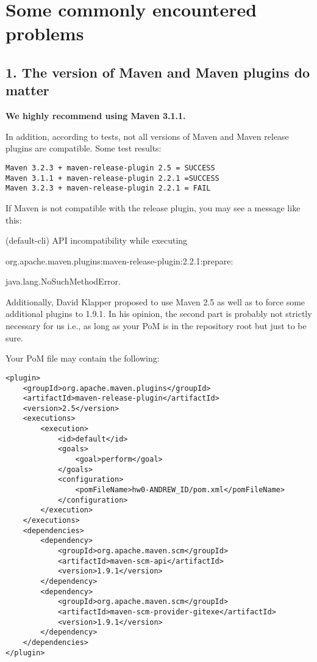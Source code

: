 \section{Some commonly encountered problems}
\label{SectCommProblem}

\subsection{1. The version of Maven and Maven plugins do matter}
\textbf{We highly recommend using Maven 3.1.1.}

In addition, according to tests, not all versions of Maven and Maven release plugins are compatible.
Some test results:
\begin{verbatim}
Maven 3.2.3 + maven-release-plugin 2.5 = SUCCESS
Maven 3.1.1 + maven-release-plugin 2.2.1 =SUCCESS
Maven 3.2.3 + maven-release-plugin 2.2.1 = FAIL
\end{verbatim}


If Maven is not compatible with the release plugin, you may see a message like this:
\begin{qa}
\item[]
(default-cli)  API incompatibility while executing 
\item[]
org.apache.maven.plugins:maven-release-plugin:2.2.1:prepare: 
\item[] java.lang.NoSuchMethodError.
\end{qa}

Additionally, David Klapper proposed to use Maven 2.5
as well as to  force some additional plugins to 1.9.1.
In his opinion, the second part is probably not strictly necessary for us i.e., 
as long as your PoM is in the repository root but just to be sure.

Your PoM file may contain the following:
\begin{verbatim}
<plugin>
    <groupId>org.apache.maven.plugins</groupId>
    <artifactId>maven-release-plugin</artifactId>
    <version>2.5</version>
    <executions>
        <execution>
            <id>default</id>
            <goals>
                <goal>perform</goal>
            </goals>
            <configuration>
                <pomFileName>hw0-ANDREW_ID/pom.xml</pomFileName>
            </configuration>
        </execution>
    </executions>
    <dependencies>
        <dependency>
            <groupId>org.apache.maven.scm</groupId>
            <artifactId>maven-scm-api</artifactId>
            <version>1.9.1</version>
        </dependency>
        <dependency>
            <groupId>org.apache.maven.scm</groupId>
            <artifactId>maven-scm-provider-gitexe</artifactId>
            <version>1.9.1</version>
        </dependency>
    </dependencies>
</plugin>
\end{verbatim}

